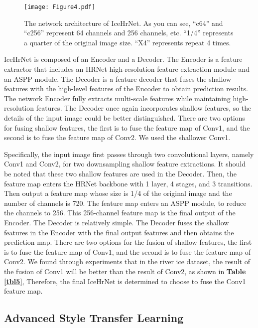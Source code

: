\documentclass[a4paper,fleqn]{cas-dc}
\begin{document}
\begin{figure}[h]
	\centering
	\texttt{[image: Figure4.pdf]}
	\caption{The network architecture of IceHrNet. As you can see, “c64” and “c256” represent 64 channels and 256 channels, etc. “1/4” represents a quarter of the original image size. “X4” represents repeat 4 times.}\label{Figure4}
\end{figure}

IceHrNet is composed of an Encoder and a Decoder. The Encoder is a feature extractor that includes an HRNet high-resolution feature extraction module and an ASPP module. The Decoder is a feature decoder that fuses the shallow features with the high-level features of the Encoder to obtain prediction results. The network Encoder fully extracts multi-scale features while maintaining high-resolution features. The Decoder once again incorporates shallow features, so the details of the input image could be better distinguished. There are two options for fusing shallow features, the first is to fuse the feature map of Conv1, and the second is to fuse the feature map of Conv2. We used the shallower Conv1.

Specifically, the input image first passes through two convolutional layers, namely Conv1 and Conv2, for two downsampling shallow feature extractions. It should be noted that these two shallow features are used in the Decoder. Then, the feature map enters the HRNet backbone with 1 layer, 4 stages, and 3 transitions. Then output a feature map whose size is 1/4 of the original image and the number of channels is 720. The feature map enters an ASPP module, to reduce the channels to 256. This 256-channel feature map is the final output of the Encoder. The Decoder is relatively simple. The Decoder fuses the shallow features in the Encoder with the final output features and then obtains the prediction map. There are two options for the fusion of shallow features, the first is to fuse the feature map of Conv1, and the second is to fuse the feature map of Conv2. We found through experiments that in the river ice dataset, the result of the fusion of Conv1 will be better than the result of Conv2, as shown in \textbf{Table \ref{tbl5}}, Therefore, the final IceHrNet is determined to choose to fuse the Conv1 feature map.

\subsection{Advanced Style Transfer Learning}
\end{document}
